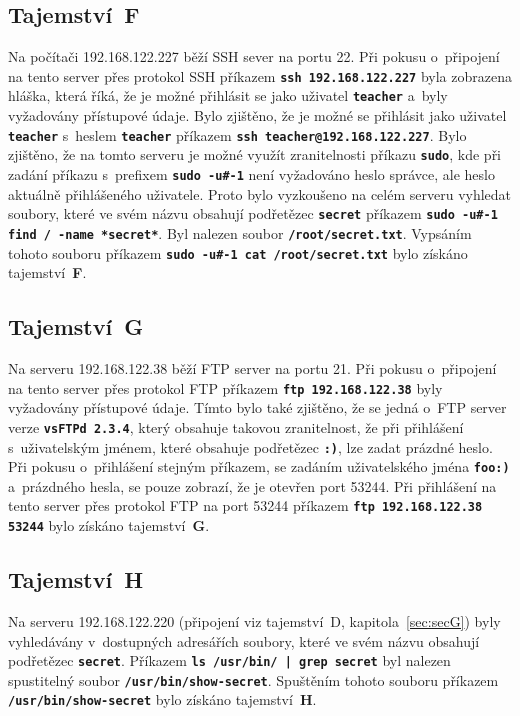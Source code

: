\documentclass[a4paper, 10pt, twocolumn]{article}
\renewcommand{\tt}[1]{\texttt{\textbf{#1}}}
\begin{document}
	\subsection{Tajemství~F}

	Na počítači 192.168.122.227 běží SSH sever na portu 22. Při pokusu
	o~připojení na tento server přes protokol SSH příkazem \tt{ssh
	192.168.122.227} byla zobrazena hláška, která říká, že je možné
	přihlásit se jako uživatel \tt{teacher} a~byly vyžadovány
	přístupové údaje. Bylo zjištěno, že je možné se přihlásit jako
	uživatel \tt{teacher} s~heslem \tt{teacher} příkazem \tt{ssh
	teacher@192.168.122.227}. Bylo zjištěno, že na tomto serveru
	je možné využít zranitelnosti příkazu \tt{sudo}, kde při zadání
	příkazu s~prefixem \tt{sudo -u\#-1} není vyžadováno heslo správce,
	ale heslo aktuálně přihlášeného uživatele. Proto bylo vyzkoušeno
	na celém serveru vyhledat soubory, které ve svém názvu obsahují
	podřetězec \tt{secret} příkazem \tt{sudo -u\#-1 find / -name
	*secret*}. Byl nalezen soubor \tt{/root/secret.txt}. Vypsáním
	tohoto souboru příkazem \tt{sudo -u\#-1 cat /root/secret.txt}
	bylo získáno tajemství~\textbf{F}.

	\subsection{Tajemství~G}

	Na serveru 192.168.122.38 běží FTP server na portu 21. Při pokusu
	o~připojení na tento server přes protokol FTP příkazem \tt{ftp
	192.168.122.38} byly vyžadovány přístupové údaje. Tímto bylo
	také zjištěno, že se jedná o~FTP server verze \tt{vsFTPd 2.3.4},
	který obsahuje takovou zranitelnost, že při přihlášení
	s~uživatelským jménem, které obsahuje podřetězec \tt{:)}, lze
	zadat prázdné heslo. Při pokusu o~přihlášení stejným příkazem, se
	zadáním uživatelského jména \tt{foo:)} a~prázdného hesla, se
	pouze zobrazí, že je otevřen port 53244. Při přihlášení na
	tento server přes protokol FTP na port 53244 příkazem \tt{ftp
	192.168.122.38 53244} bylo získáno tajemství~\textbf{G}.

	\subsection{Tajemství~H}

	Na serveru 192.168.122.220 (připojení viz tajemství~D,
	kapitola~\ref{sec:secG}) byly vyhledávány v~dostupných adresářích
	soubory, které ve svém názvu obsahují podřetězec \tt{secret}. Příkazem
	\tt{ls /usr/bin/ | grep secret} byl nalezen spustitelný soubor
	\tt{/usr/bin/show-secret}. Spuštěním tohoto souboru příkazem
	\tt{/usr/bin/show-secret} bylo získáno tajemství~\textbf{H}.
\end{document}
